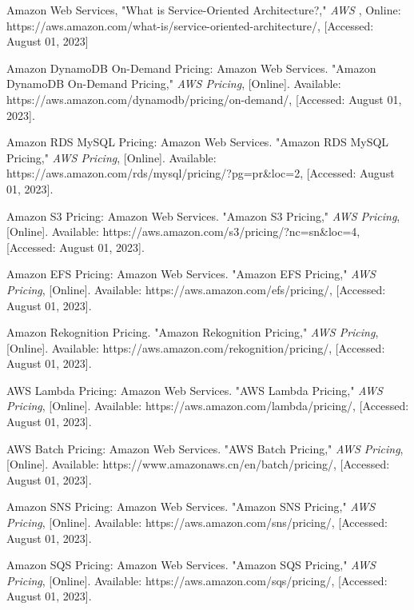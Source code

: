 \begin{sloppypar}
\begin{enumerate}[label={[\arabic*]}]
    \item Amazon Web Services, "What is Service-Oriented Architecture?," \textit{AWS} , Online: https://aws.amazon.com/what-is/service-oriented-architecture/, [Accessed: August 01, 2023]

    \item Amazon DynamoDB On-Demand Pricing:
Amazon Web Services. "Amazon DynamoDB On-Demand Pricing," \textit{AWS Pricing}, [Online]. Available: https://aws.amazon.com/dynamodb/pricing/on-demand/, [Accessed: August 01, 2023].

    \item Amazon RDS MySQL Pricing:
Amazon Web Services. "Amazon RDS MySQL Pricing," \textit{AWS Pricing}, [Online]. Available: https://aws.amazon.com/rds/mysql/pricing/?pg=pr\&loc=2, [Accessed: August 01, 2023].

    \item Amazon S3 Pricing:
Amazon Web Services. "Amazon S3 Pricing," \textit{AWS Pricing}, [Online]. Available: https://aws.amazon.com/s3/pricing/?nc=sn\&loc=4, [Accessed: August 01, 2023].

    \item Amazon EFS Pricing:
Amazon Web Services. "Amazon EFS Pricing," \textit{AWS Pricing}, [Online]. Available: https://aws.amazon.com/efs/pricing/, [Accessed: August 01, 2023].

\item Amazon Rekognition Pricing. "Amazon Rekognition Pricing," \textit{AWS Pricing}, [Online]. Available: https://aws.amazon.com/rekognition/pricing/, [Accessed: August 01, 2023].

    \item AWS Lambda Pricing:
Amazon Web Services. "AWS Lambda Pricing," \textit{AWS Pricing}, [Online]. Available: https://aws.amazon.com/lambda/pricing/, [Accessed: August 01, 2023].

    \item AWS Batch Pricing:
Amazon Web Services. "AWS Batch Pricing," \textit{AWS Pricing}, [Online]. Available: https://www.amazonaws.cn/en/batch/pricing/, [Accessed: August 01, 2023].

    \item Amazon SNS Pricing:
Amazon Web Services. "Amazon SNS Pricing," \textit{AWS Pricing}, [Online]. Available: https://aws.amazon.com/sns/pricing/, [Accessed: August 01, 2023].

    \item Amazon SQS Pricing:
Amazon Web Services. "Amazon SQS Pricing," \textit{AWS Pricing}, [Online]. Available: https://aws.amazon.com/sqs/pricing/, [Accessed: August 01, 2023].


\end{enumerate}
\end{sloppypar}
